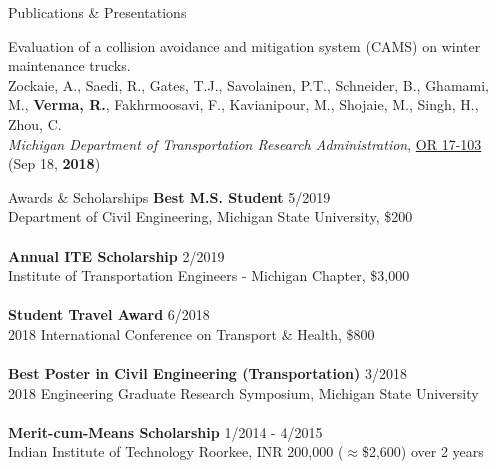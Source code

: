 \documentclass{resume} %
\begin{document}
\begin{rSection}{Publications \& Presentations}
\begin{etaremune}
            \item Evaluation of a collision avoidance and mitigation system (CAMS) on winter maintenance trucks.
            \\ Zockaie, A., Saedi, R., Gates, T.J., Savolainen, P.T., Schneider, B., Ghamami, M., \textbf{Verma, R.}, Fakhrmoosavi, F., Kavianipour, M., Shojaie, M., Singh, H., Zhou, C.
            \\ \textit{Michigan Department of Transportation Research Administration}, \href{https://rosap.ntl.bts.gov/view/dot/42752}{OR 17-103} (Sep 18, \textbf{2018})
        \end{etaremune}

    \end{rSection}

    \begin{rSection}{Awards \& Scholarships}
        \textbf{Best M.S. Student} \hfill {5/2019}
        \\ Department of Civil Engineering, Michigan State University, \$200 \\
        \\ \textbf{Annual ITE Scholarship} \hfill {2/2019}
        \\ Institute of Transportation Engineers - Michigan Chapter, \$3,000 \\
        \\ \textbf{Student Travel Award} \hfill {6/2018}
        \\ 2018 International Conference on Transport \& Health, \$800 \\
        \\ \textbf{Best Poster in Civil Engineering (Transportation)} \hfill{3/2018}
        \\ 2018 Engineering Graduate Research Symposium, Michigan State University \\
        \\ \textbf{Merit-cum-Means Scholarship} \hfill{1/2014 - 4/2015}
        \\ Indian Institute of Technology Roorkee, INR 200,000 ($\approx$\$2,600) over 2 years
    \end{rSection}
\end{document}

